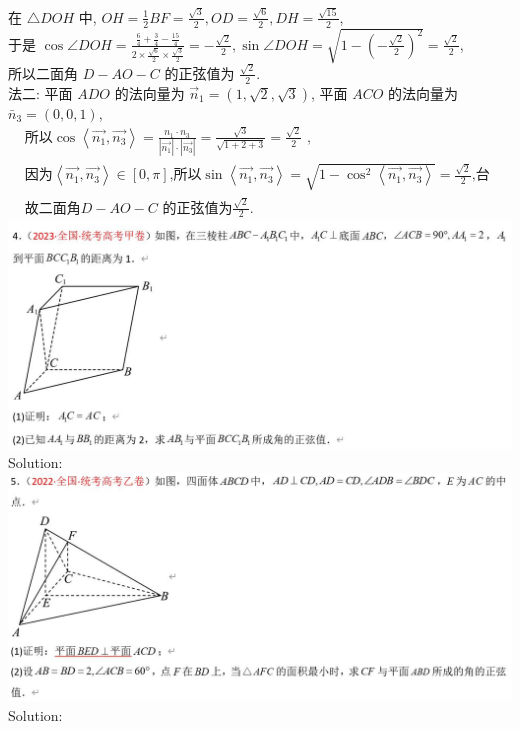 \documentclass[a4paper,11pt,UTF8]{article}
\begin{document}
在 $\displaystyle\triangle D O H$ 中, $\displaystyle O H=\frac{1}{2} B F=\frac{\sqrt{3}}{2}, O D=\frac{\sqrt{6}}{2}, D H=\frac{\sqrt{15}}{2}$,\\
于是 $\displaystyle\cos \angle D O H=\frac{\frac{6}{4}+\frac{3}{4}-\frac{15}{4}}{2 \times \frac{\sqrt{6}}{2} \times \frac{\sqrt{3}}{2}}=-\frac{\sqrt{2}}{2}, \sin \angle D O H=\sqrt{1-\left(-\frac{\sqrt{2}}{2}\right)^2}=\frac{\sqrt{2}}{2}$, \\所以二面角 $D-A O-C$ 的正弦值为 $\displaystyle\frac{\sqrt{2}}{2}$.\\
法二: 平面 $A D O$ 的法向量为 $\vec{n}_1=(1, \sqrt{2}, \sqrt{3})$, 平面 $A C O$ 的法向量为 $\bar{n}_3=(0,0,1)$,\\
$\begin{aligned}
	&\text{所以}\cos\left\langle\overrightarrow{n_1},\overrightarrow{n_3}\right\rangle=\frac{n_1\cdot n_3}{\left|\overrightarrow{n_1}\right|\cdot\left|\overrightarrow{n_3}\right|}=\frac{\sqrt{3}}{\sqrt{1+2+3}}=\frac{\sqrt{2}}2\text{ , } \\
	&\text{因为}\left\langle\overrightarrow{n_1},\overrightarrow{n_3}\right\rangle\in\left[0,\pi\right]\text{,所以}\sin\left\langle\overrightarrow{n_1},\overrightarrow{n_3}\right\rangle=\sqrt{1-\cos^2\left\langle\overrightarrow{n_1},\overrightarrow{n_3}\right\rangle}=\frac{\sqrt{2}}2\text{,台} \\
	&\text{故二面角}D-AO-C\text{ 的正弦值为}\frac{\sqrt{2}}2.
	

\end{aligned}$\\
\includegraphics[scale=0.5]{./2023_jia.jpg}\\
Solution:\\
\includegraphics[scale=0.5]{./2022_yi.jpg}\\
Solution:\\
\end{document}
